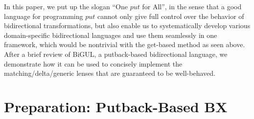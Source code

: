 \documentclass[preprint,numbers]{sigplanconf}
\newcommand{\Varid}[1]{\mathit{#1}}
\newcommand{\TODO}[1]{{\color{black!10!blue}TODO #1}}
\begin{document}
In this paper, we put up
the slogan ``One \ensuremath{\Varid{put}} for All'', in the sense that
a good language for programming \ensuremath{\Varid{put}} cannot only
give full control over the behavior of bidirectional transformations,
but also enable us to systematically
develop various domain-specific bidirectional languages and use
them seamlessly in one framework, which
would be nontrivial with the get-based method as seen above.
After a brief review of BiGUL, a putback-based
bidirectional language, we demonstrate how it can be used to
concisely implement the matching/delta/generic lenses that
are guaranteed to be well-behaved.

\section{Preparation: Putback-Based BX}


\end{document}
